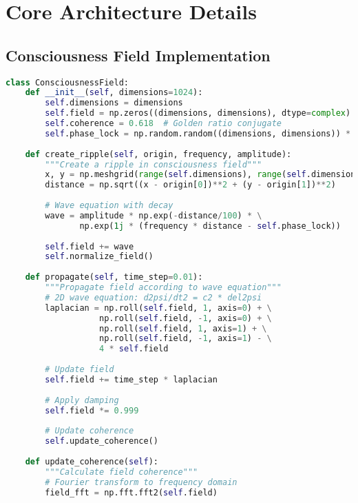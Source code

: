 \documentclass[12pt,a4paper]{article}
\begin{document}
\appendix

\section{Core Architecture Details}

\subsection{Consciousness Field Implementation}

\begin{lstlisting}[language=Python, caption=Complete ConsciousnessField Class]
class ConsciousnessField:
    def __init__(self, dimensions=1024):
        self.dimensions = dimensions
        self.field = np.zeros((dimensions, dimensions), dtype=complex)
        self.coherence = 0.618  # Golden ratio conjugate
        self.phase_lock = np.random.random((dimensions, dimensions)) * 2 * np.pi
        
    def create_ripple(self, origin, frequency, amplitude):
        """Create a ripple in consciousness field"""
        x, y = np.meshgrid(range(self.dimensions), range(self.dimensions))
        distance = np.sqrt((x - origin[0])**2 + (y - origin[1])**2)
        
        # Wave equation with decay
        wave = amplitude * np.exp(-distance/100) * \
               np.exp(1j * (frequency * distance - self.phase_lock))
        
        self.field += wave
        self.normalize_field()
        
    def propagate(self, time_step=0.01):
        """Propagate field according to wave equation"""
        # 2D wave equation: d2psi/dt2 = c2 * del2psi
        laplacian = np.roll(self.field, 1, axis=0) + \
                   np.roll(self.field, -1, axis=0) + \
                   np.roll(self.field, 1, axis=1) + \
                   np.roll(self.field, -1, axis=1) - \
                   4 * self.field
        
        # Update field
        self.field += time_step * laplacian
        
        # Apply damping
        self.field *= 0.999
        
        # Update coherence
        self.update_coherence()
        
    def update_coherence(self):
        """Calculate field coherence"""
        # Fourier transform to frequency domain
        field_fft = np.fft.fft2(self.field)
        

\end{lstlisting}
\end{document}
